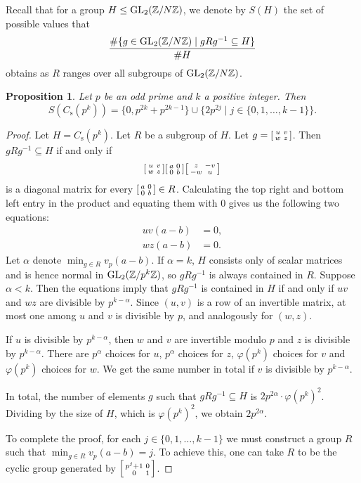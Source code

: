 \documentclass[10pt,leqno]{amsart}
\newcommand\sm[1]{\begin{bsmallmatrix}#1\end{bsmallmatrix}}
\newcommand{\Z}{\mathbb{Z}}
\newcommand{\GL}{\textnormal{GL}}
\newtheorem{proposition}[theorem]{Proposition}
\theoremstyle{definition}
\theoremstyle{remark}
\numberwithin{theorem}{section}
\begin{document}
Recall that for a group $H\leq \GL_2(\Z/N\Z)$, we denote by  $S(H)$ the set of possible values that $$\frac{\#\{g \in \GL_2(\Z/N\Z) \mid gRg^{-1}\subseteq H\}}{\#H}$$ obtains as $R$ ranges over all subgroups of $\GL_2(\Z/N\Z)$. 

\begin{proposition}
    Let $p$ be an odd prime and $k$ a positive integer. Then $$S(C_{\mathrm s}(p^k))=\{ 0, p^{2k}+p^{2k-1}\}\cup \{2p^{2j} \mid j\in \{0,1,\ldots, k-1\}\}.
    $$
\end{proposition}
\begin{proof}
    Let $H=C_{\mathrm s}(p^k)$. Let $R$ be a subgroup of $H$. Let $g=\sm{u & v \\ w & z}$. Then $gRg^{-1}\subseteq H$ if and only if $$\sm{u & v \\ w & z} \sm{a & 0 \\ 0 & b} \sm{z & -v \\ -w & u}$$ is a diagonal matrix for every $\sm{a & 0 \\ 0 & b} \in R$. Calculating the top right and bottom left entry in the product and equating them with $0$ gives us the following two equations: \begin{align*}
        uv(a-b)&=0, \\
        wz(a-b)&=0.
    \end{align*}
    Let $\alpha$ denote $\min_{g \in R} v_p(a-b)$. If $\alpha=k$, $H$ consists only of scalar matrices and is hence normal in $\GL_2(\Z/p^k\Z)$, so $gRg^{-1}$ is always contained in $R$. Suppose $\alpha<k$. Then the equations imply that $gRg^{-1}$ is contained in $H$ if and only if $uv$ and $wz$ are divisible by $p^{k-\alpha}$. Since $(u, v)$ is a row of an invertible matrix, at most one among $u$ and $v$ is divisible by $p$, and analogously for $(w, z)$. 
    
    If $u$ is divisible by $p^{k-\alpha}$, then $w$ and $v$ are invertible modulo $p$ and $z$ is divisible by $p^{k-\alpha}$. There are $p^{\alpha}$ choices for $u$, $p^\alpha$ choices for $z$, $\varphi(p^k)$ choices for $v$ and $\varphi(p^k)$ choices for $w$. We get the same number in total if $v$ is divisible by $p^{k-\alpha}$. 

    In total, the number of elements $g$ such that $gRg^{-1}\subseteq H$ is $2p^{2\alpha} \cdot \varphi(p^k)^2$. Dividing by the size of $H$, which is $\varphi(p^k)^2$, we obtain $2p^{2\alpha}$.

    To complete the proof, for each $j \in \{0,1,\ldots, k-1\}$ we must construct a group $R$ such that $\min_{g \in R} v_p(a-b)=j$. To achieve this, one can take $R$ to be the cyclic group generated by $\sm{p^j+1 & 0 \\
     0 & 1}$.
\end{proof}
\end{document}
